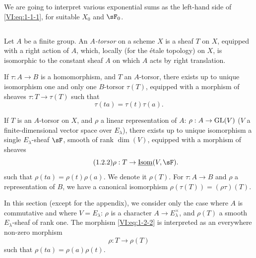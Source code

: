 We are going to interpret various exponential sums as the left-hand side
of \eqref{VI:eq:1-1-1}, for suitable $X_0$ and $\sF_0$. 





\subsection{}\label{VI:1-2}

Let $A$ be a finite group. An \emph{$A$-torsor} on a scheme $X$ is a
sheaf $T$ on $X$, equipped with a right action of $A$, which, locally
(for the étale topology) on $X$, is isomorphic to the constant sheaf $A$ on
which $A$ acts by right translation.

If $\tau:A\to B$ is a homomorphism, and $T$ an $A$-torsor, there exists up to
unique isomorphism one and only one $B$-torsor $\tau(T)$, equipped with a
morphism of sheaves $\tau:T\to \tau(T)$ such that 
\begin{equation*}\tag{1.2.1}\label{VI:eq:1-2-1}
  \tau(t a) = \tau(t) \tau(a)\text{.}
\end{equation*}

If $T$ is an $A$-torsor on $X$, and $\rho$ a linear representation
of $A$: $\rho:A\to \operatorname{GL}(V)$ ($V$ a finite-dimensional vector space over
$E_\lambda$), there exists up to unique isomorphism a single
$E_\lambda$-sheaf $\sF$, smooth of rank $\dim(V)$, equipped with a morphism of
sheaves 
\begin{equation*}\tag{1.2.2}\label{VI:eq:1-2-2}
  \rho:T\to \underline{\operatorname{Isom}}(V,\sF) \text{.}
\end{equation*}
such that $\rho(t a) = \rho(t) \rho(a)$. We denote it $\rho(T)$. For
$\tau:A\to B$ and $\rho$ a representation of $B$, we have a canonical
isomorphism $\rho(\tau(T)) = (\rho\tau)(T)$.

In this section (except for the appendix), we consider only the case where $A$
is commutative and where $V=E_\lambda$: $\rho$ is a character
$A\to E_\lambda^\times$, and $\rho(T)$ a smooth $E_\lambda$-sheaf of rank
one. The morphism \eqref{VI:eq:1-2-2} is interpreted as an everywhere
non-zero morphism 
\begin{equation*}\tag{1.2.3}\label{VI:eq:1-2-3}
  \rho:T\to \rho(T) 
\end{equation*}
such that $\rho(t a) = \rho(a)\rho(t)$. 





